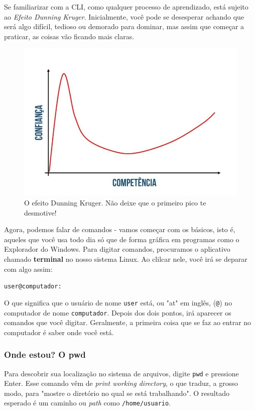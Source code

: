 \documentclass{article}
\begin{document}
	Se familiarizar com a CLI, como qualquer processo de aprendizado, está sujeito ao \textit{Efeito Dunning Kruger}. 
	Inicialmente, você pode se desesperar achando que será algo difícil, tedioso ou demorado para dominar, mas assim que
	começar a praticar, as coisas vão ficando mais claras. 

	\begin{figure}[h!]
  		\centering
		\includegraphics[scale=0.3]{figs/dk.jpeg} 
  		\caption{O efeito Dunning Kruger. Não deixe que o primeiro pico te desmotive!}
	\end{figure}
	
	Agora, podemos falar de comandos - vamos começar com os básicos, isto é, aqueles que você usa todo dia só que de forma gráfica
	em programas como o Explorador do Windows. Para digitar comandos, procuramos o aplicativo chamado \textbf{terminal} no 
	nosso sistema Linux. Ao clilcar nele, você irá se deparar com algo assim: 
	
	\vspace{1ex}
	\texttt{user@computador: ~}
	\vspace{1ex}

	O que significa que o usuário de nome \texttt{user} está, ou "at" em inglês, (\texttt{@}) no computador de nome
	\texttt{computador}. Depois dos dois pontos, irá aparecer os comandos que você digitar. Geralmente, a primeira coisa
	que se faz ao entrar no computador é saber onde você está. 
	
	\subsubsection{Onde estou? O pwd}
	Para descobrir sua localização no sistema de arquivos, digite \texttt{pwd} e pressione Enter. Esse comando vêm de 
	\textit{print working directory}, o que traduz, a grosso modo, para "mostre o diretório no qual se está trabalhando". O
	resultado esperado é um caminho ou \textit{path} como \texttt{/home/usuario}. 
\end{document}
